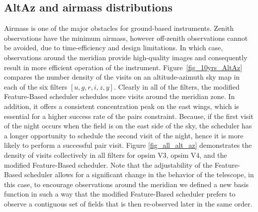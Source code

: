 \documentclass[12pt]{aastex62}
\theoremstyle{definition}
\begin{document}
\subsection{AltAz and airmass distributions}
Airmass is one of the major obstacles for ground-based instruments. Zenith observations have the minimum airmass, however off-zenith observations cannot be avoided, due to time-efficiency and design limitations. In which case, observations around the meridian provide high-quality images and consequently result in more efficient operation of the instrument. Figure~\ref{fig_10yrs_AltAz} compares the number density of the visits on an altitude-azimuth sky map in each of the six filters $[u,g,r,i,z,y]$. Clearly in all of the filters, the modified Feature-Based scheduler schedules more visits around the meridian zone. In addition, it offers a consistent concentration peak on the east wings, which is essential for a higher success rate of the pairs constraint. Because, if the first visit of the night occurs when the field is on the east side of the sky, the scheduler has a longer opportunity to schedule the second visit of the night, hence it is more likely to perform a successful pair visit. Figure \ref{fig_all_alt_az} demonstrates the density of visits collectively in all filters for opsim V3, opsim V4, and the modified Feature-Based scheduler. Note that the adjustability of the Feature-Based scheduler allows for a significant change in the behavior of the telescope, in this case, to encourage observations around the meridian we defined a new basis function in such a way that the modified Feature-Based scheduler prefers to observe a contiguous set of fields that is then re-observed later in the same order.
%
\end{document}
